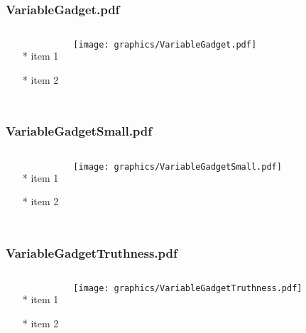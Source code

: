 \documentclass{beamer}
\begin{document}
\begin{frame} \frametitle{VariableGadget.pdf}
    \begin{columns}[c]
        \begin{itemize}
            \item[*] item 1
            \item[*] item 2
        \end{itemize}
        \begin{minipage}{\linewidth}
            \begin{center}
            \texttt{[image: graphics/VariableGadget.pdf]}
            \label{gfx:VariableGadget.pdf}
            \end{center}
        \end{minipage}
    \end{columns}
\end{frame}
\begin{frame} \frametitle{VariableGadgetSmall.pdf}
    \begin{columns}[c]
        \begin{itemize}
            \item[*] item 1
            \item[*] item 2
        \end{itemize}
        \begin{minipage}{\linewidth}
            \begin{center}
            \texttt{[image: graphics/VariableGadgetSmall.pdf]}
            \label{gfx:VariableGadgetSmall.pdf}
            \end{center}
        \end{minipage}
    \end{columns}
\end{frame}
\begin{frame} \frametitle{VariableGadgetTruthness.pdf}
    \begin{columns}[c]
        \begin{itemize}
            \item[*] item 1
            \item[*] item 2
        \end{itemize}
        \begin{minipage}{\linewidth}
            \begin{center}
            \texttt{[image: graphics/VariableGadgetTruthness.pdf]}
            \label{gfx:VariableGadgetTruthness.pdf}
            \end{center}
        \end{minipage}
    \end{columns}
\end{frame}
\end{document}
